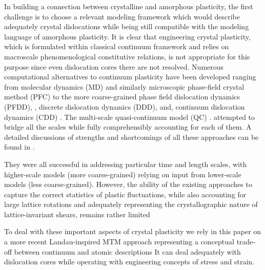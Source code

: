 \documentclass[aps,
superscriptaddress,notitlepage]{revtex4-1}
\begin{document}
In building a connection between crystalline and amorphous plasticity,  the  first challenge is to choose a relevant modeling framework which would   describe  adequately  crystal dislocations while being still compatible with the  modeling language  of  amorphous plasticity.  It is clear that engineering crystal plasticity, which  is  formulated within classical continuum framework  and relies on macroscale phenomenological constitutive relations, is not appropriate for this purpose since even dislocation cores there are not resolved. Numerous computational alternatives to continuum plasticity have been developed ranging from molecular dynamics (MD) \cite{Arsenlis2007-oz,Zepeda-Ruiz2021-bm,Ponga2020-kd,Lafourcade2025-pc} and similarly microscopic phase-field crystal method (PFC) \cite{Chan2010-qt,Salvalaglio2020-aw,Zhong2025-df} to the more coarse-grained phase field dislocation dynamics (PFDD), \cite{Javanbakht2016-dr,Beyerlein2016-av,Koslowski2002-dn,Wang:2003zh},  discrete dislocation dynamics (DDD), \cite{Devincre2008-mw,Ispanovity2014-ra,Gomez-Garcia2006-zn,Po2014-qu,Lu2022-ai,Bertin2024-jw,Nasir-Tak2025-kq} and, continuum dislocation dynamics (CDD) \cite{Starkey2020-yv,Zhang2025-cm,Acharya2022-ur,Acharya2006-du}. 
The multi-scale quasi-continuum model (QC) \cite{Rodney1999-em,Van-Koten2011-tt,Miller2002-pa,Zhang2018-in}. 
attempted to bridge all the scales while fully comprehensibly accounting for each of them. A detailed discussions of strengths and shortcomings of all these approaches can be found in \cite{Salman2021,perchikov2024,Baggio2023-qu}. 

They were all successful in addressing particular time and length scales, with higher-scale models (more coarse-grained) relying on input from lower-scale models (less coarse-grained). However,  the ability of the existing approaches to capture the correct statistics of plastic fluctuations, while also accounting for large lattice rotations and adequately representing the crystallographic nature of lattice-invariant shears, remains rather limited \cite{Weiss2021-tt,Weiss2015-eh}



To deal with these important aspects of crystal plasticity we rely in this paper on a more recent  Landau-inspired  MTM  approach   representing a conceptual trade-off between continuum  and atomic descriptions It can deal adequately with dislocation cores  while operating with engineering concepts of stress and strain\cite{Ericksen1970,ericksen1973loading,Ericksen1977,Ericksen1980,ericksen1989weak,parry1976elasticity,Parry1977,Parry1998,Folkins1991,Conti2004-sv,Salman2011,Salman2012b,Baggio2019,Salman2021,perchikov2024,Baggio2023,Baggio2023-qu,Zhang2020-ax}.
\end{document}
